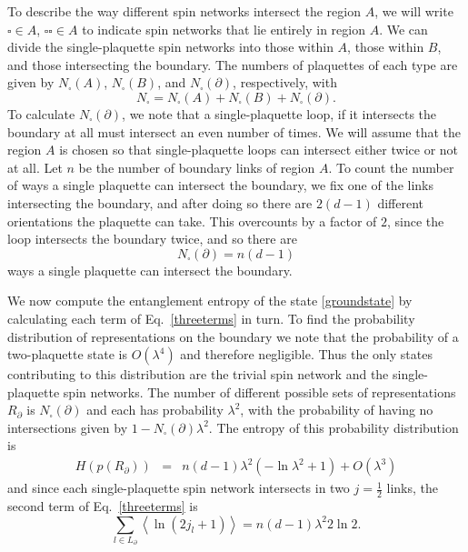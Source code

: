 \documentclass[aps,prd,twocolumn,showpacs,groupedaddress,nofootinbib,letterpaper]{revtex4}
\newcommand{\avg}[1]{\left\langle#1\right\rangle}
\newcommand{\oneloop}{\square}
\newcommand{\twoloop}{\square\!\square}
\begin{document}
To describe the way different spin networks intersect the region $A$, we will write $\oneloop \in A$, $\twoloop \in A$ to indicate spin networks that lie entirely in region $A$.
We can divide the single-plaquette spin networks into those within $A$, those within $B$, and those intersecting the boundary.
The numbers of plaquettes of each type are given by $N_\oneloop(A)$, $N_\oneloop(B)$, and $N_\oneloop(\partial)$, respectively, with
\begin{equation}
N_\oneloop = N_\oneloop(A) + N_\oneloop(B) + N_\oneloop(\partial).
\end{equation}
To calculate $N_\oneloop(\partial)$, we note that a single-plaquette loop, if it intersects the boundary at all must intersect an even number of times. 
We will assume that the region $A$ is chosen so that single-plaquette loops can intersect either twice or not at all.
Let $n$ be the number of boundary links of region $A$.
To count the number of ways a single plaquette can intersect the boundary, we fix one of the links intersecting the boundary, and after doing so there are $2 (d-1)$ different orientations the plaquette can take.
This overcounts by a factor of $2$, since the loop intersects the boundary twice, and so there are
\begin{equation}
N_\oneloop(\partial) = n(d-1)
\end{equation}
ways a single plaquette can intersect the boundary.

We now compute the entanglement entropy of the state \eqref{groundstate} by calculating each term of Eq.~\eqref{threeterms} in turn.
To find the probability distribution of representations on the boundary we note that the probability of a two-plaquette state is $O(\lambda^4)$ and therefore negligible.
Thus the only states contributing to this distribution are the trivial spin network and the single-plaquette spin networks.
The number of different possible sets of representations $R_\partial$ is $N_\oneloop(\partial)$ and each has probability $\lambda^2$, with the probability of having no intersections given by $1 - N_\oneloop(\partial) \lambda^2$.
The entropy of this probability distribution is
\begin{eqnarray}
H(p(R_\partial))
&=& n (d-1) \lambda^2 ( -\ln \lambda^2 + 1) + O(\lambda^3)
\end{eqnarray}
and since each single-plaquette spin network intersects in two $j=\tfrac{1}{2}$ links, the second term of Eq.~\ref{threeterms} is
\begin{equation}
\sum_{l \in L_{\partial}} \avg{\ln (2 j_l + 1)} = n (d-1) \lambda^2 2 \ln 2.
\end{equation}
\end{document}
